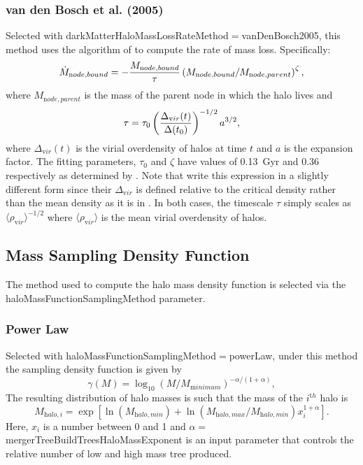 \subsubsection{van den Bosch et al. (2005)}

Selected with {\normalfont \ttfamily darkMatterHaloMassLossRateMethod}$=${\normalfont \ttfamily vanDenBosch2005}, this method uses the algorithm of \cite{van_den_bosch_mass_2005} to compute the rate of mass loss. Specifically:
\begin{equation}
\dot{M}_{\mathrm node,bound} = -{M_{\mathrm node,bound}\over \tau} \left({M_{\mathrm node,bound} / M_{\mathrm node,parent}}\right)^\zeta,
\end{equation}
where $M_{\mathrm node,parent}$ is the mass of the parent \gls{node} in which the halo lives and
\begin{equation}
\tau = \tau_0 \left({\Delta_{\mathrm vir}(t) \over \Delta(t_0)}\right)^{-1/2} a^{3/2},
\end{equation}
where $\Delta_{\mathrm vir}(t)$ is the virial overdensity of halos at time $t$ and $a$ is the expansion factor. The fitting parameters, $\tau_0$ and $\zeta$ have values of 0.13~Gyr and 0.36 respectively as determined by \cite{van_den_bosch_mass_2005}. Note that  \cite{van_den_bosch_mass_2005} write this expression in a slightly different form since their $\Delta_{\mathrm vir}$ is defined relative to the critical density rather than the mean density as it is in \glc. In both cases, the timescale $\tau$ simply scales as $\langle \rho_{\mathrm vir} \rangle ^{-1/2}$ where $\langle \rho_{\mathrm vir} \rangle$ is the mean virial overdensity of halos.

\subsection{Mass Sampling Density Function}\label{sec:MassSamplingDensityFunction}

The method used to compute the halo mass density function is selected via the {\normalfont \ttfamily haloMassFunctionSamplingMethod} parameter.

\subsubsection{Power Law}

Selected with {\normalfont \ttfamily haloMassFunctionSamplingMethod}$=${\normalfont \ttfamily powerLaw}, under this method the sampling density function is given by
\begin{equation}
\gamma(M) = \log_{10}(M/M_{\mathrm minimum})^{-\alpha/(1+\alpha)},
\end{equation}
The resulting distribution of halo masses is such that the mass of the $i^{\mathrm th}$ halo is
\begin{equation}
 M_{\mathrm halo,i} = \exp\left[ \ln(M_{\mathrm halo,min}) + \ln\left({M_{\mathrm halo,max}/M_{\mathrm halo,min}}\right) x_i^{1+\alpha} \right].
\end{equation}
Here, $x_i$ is a number between 0 and 1 and $\alpha=${\normalfont \ttfamily mergerTreeBuildTreesHaloMassExponent} is an input parameter that controls the relative number of low and high mass tree produced.


